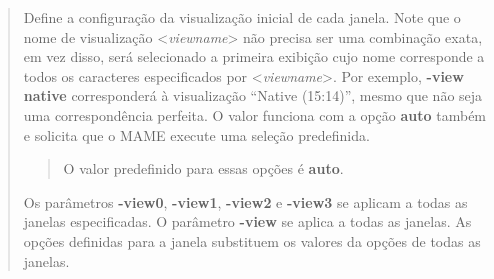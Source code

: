 \documentclass[letterpaper,10pt,brazil]{sphinxmanual}
\begin{document}
\begin{quote}

Define a configuração da visualização inicial de cada janela.
Note que o nome de visualização \textless{}\emph{viewname}\textgreater{} não precisa ser uma
combinação exata, em vez disso, será selecionado a primeira exibição
cujo nome corresponde a todos os caracteres especificados por
\textless{}\emph{viewname}\textgreater{}.
Por exemplo, \textbf{-view native} corresponderá à visualização
``Native (15:14)'', mesmo que não seja uma correspondência perfeita.
O valor funciona com a opção \textbf{auto} também e solicita que o MAME
execute uma seleção predefinida.
\begin{quote}

O valor predefinido para essas opções é \textbf{auto}.
\end{quote}

Os parâmetros \textbf{-view0}, \textbf{-view1}, \textbf{-view2} e \textbf{-view3} se
aplicam a todas as janelas especificadas. O parâmetro \textbf{-view} se
aplica a todas as janelas.
As opções definidas para a janela substituem os valores da opções de
todas as janelas.
\end{quote}
\end{document}
